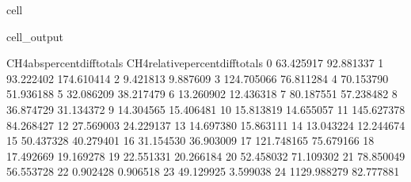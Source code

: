 \documentclass[letterpaper,10pt,english]{jupyterBook}
\begin{document}
\begin{sphinxuseclass}{cell}
\begin{sphinxVerbatimOutput}
\begin{sphinxuseclass}{cell_output}
\begin{sphinxVerbatim}[commandchars=\\\{\}]
    CH4\PYGZus{}abs\PYGZus{}percent\PYGZus{}diff\PYGZus{}totals  CH4\PYGZus{}relative\PYGZus{}percent\PYGZus{}diff\PYGZus{}totals  \PYGZbs{}
0                     63.425917                        \PYGZhy{}92.881337   
1                     93.222402                       \PYGZhy{}174.610414   
2                      9.421813                         \PYGZhy{}9.887609   
3                    124.705066                         76.811284   
4                     70.153790                         51.936188   
5                     32.086209                        \PYGZhy{}38.217479   
6                     13.260902                         12.436318   
7                     80.187551                         57.238482   
8                     36.874729                         31.134372   
9                     14.304565                        \PYGZhy{}15.406481   
10                    15.813819                         14.655057   
11                   145.627378                         84.268427   
12                    27.569003                         24.229137   
13                    14.697380                        \PYGZhy{}15.863111   
14                    13.043224                         12.244674   
15                    50.437328                         40.279401   
16                    31.154530                        \PYGZhy{}36.903009   
17                   121.748165                         75.679166   
18                    17.492669                        \PYGZhy{}19.169278   
19                    22.551331                         20.266184   
20                    52.458032                        \PYGZhy{}71.109302   
21                    78.850049                         56.553728   
22                     0.902428                         \PYGZhy{}0.906518   
23                    49.129925                          3.599038   
24                  1129.988279                         82.777881   


\end{sphinxVerbatim}
\end{sphinxuseclass}
\end{sphinxVerbatimOutput}
\end{sphinxuseclass}
\end{document}
